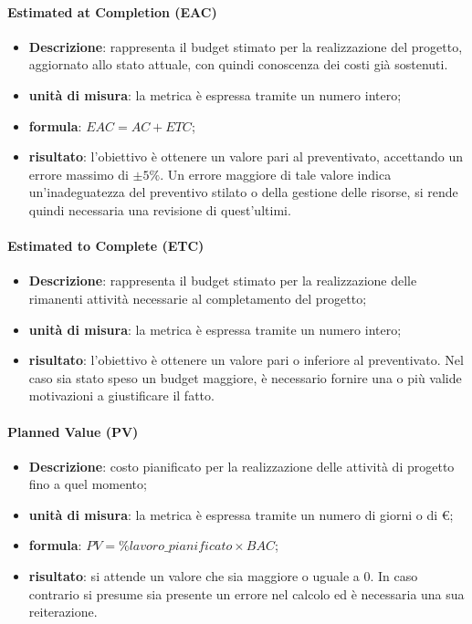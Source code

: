 				\paragraph{Estimated at Completion (EAC)}
					\begin{itemize}
						\item \textbf{Descrizione}: rappresenta il budget stimato per la realizzazione del progetto, aggiornato allo stato attuale, con quindi conoscenza dei costi già sostenuti.
						\item \textbf{unità di misura}: la metrica è espressa tramite un numero intero;
						\item \textbf{formula}: $EAC = AC + ETC$;
						\item \textbf{risultato}: l'obiettivo è ottenere un valore pari al preventivato, accettando un errore massimo di $\pm{}5\%$. Un errore maggiore di tale valore indica un'inadeguatezza del preventivo stilato o della gestione delle risorse, si rende quindi necessaria una revisione di quest'ultimi.
					\end{itemize}
				\paragraph{Estimated to Complete (ETC)}
					\begin{itemize}
						\item \textbf{Descrizione}: rappresenta il budget stimato per la realizzazione delle rimanenti attività necessarie al completamento del progetto;
						\item \textbf{unità di misura}: la metrica è espressa tramite un numero intero;
						\item \textbf{risultato}: l'obiettivo è ottenere un valore pari o inferiore al preventivato. Nel caso sia stato speso un budget maggiore, è necessario fornire una o più valide motivazioni a giustificare il fatto.
					\end{itemize}
				\paragraph{Planned Value (PV)}
					\begin{itemize}
						\item \textbf{Descrizione}: costo pianificato per la realizzazione delle attività di progetto fino a quel momento;
						\item \textbf{unità di misura}: la metrica è espressa tramite un numero di giorni o di \euro;
						\item \textbf{formula}: $PV = \%lavoro\_pianificato \times BAC$;
						\item \textbf{risultato}: si attende un valore che sia maggiore o uguale a 0. In caso contrario si presume sia presente un errore nel calcolo ed è necessaria una sua reiterazione.
					\end{itemize}
